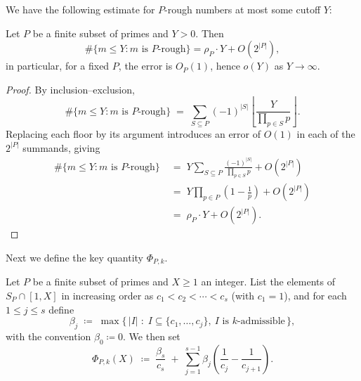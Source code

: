 \documentclass{amsart}
\begin{document}
We have the following estimate for $P$-rough numbers at most some cutoff $Y$:
\begin{lemma}\label{lem:P-rough-estimate}
   Let $P$ be a finite subset of primes and $Y > 0$. Then
   \begin{equation}
       \# \{m \leq Y : m \text{ is $P$-rough}\} = \rho_P \cdot Y + O (2^{|P|}),
   \end{equation}
   in particular, for a fixed $P$, the error is $O_P(1)$, hence $o(Y)$ as $Y \to \infty$.
\end{lemma}
\begin{proof}
By inclusion--exclusion,
\begin{equation}
\# \{m \leq Y : m \text{ is $P$-rough}\}  \;=\; \sum_{S \subseteq P} (-1)^{|S|} \left\lfloor \frac{Y}{\prod_{p \in S} p} \right\rfloor.
\end{equation}
Replacing each floor by its argument introduces an error of $O(1)$ in each of the $2^{|P|}$ summands, giving
\begin{equation}
\begin{aligned}
\# \{m \leq Y : m \text{ is $P$-rough}\} &\;=\; Y \sum_{S \subseteq P} \frac{(-1)^{|S|}}{\prod_{p \in S} p} + O(2^{|P|}) \\
&\;=\; Y \prod_{p \in P} \left(1 - \tfrac{1}{p}\right) + O(2^{|P|}) \\
&\;=\; \rho_P \cdot Y + O(2^{|P|}).
\end{aligned}
\end{equation}
\end{proof}

Next we define the key quantity $\Phi_{P,k}$.
\begin{definition}\label{def:phi-X-K}
   Let $P$ be a finite subset of primes and $X \geq 1$ an integer. List the elements of
$S_P \cap [1, X]$ in increasing order as $c_1 < c_2 < \cdots < c_s$ (with $c_1 = 1$), and
for each $1 \leq j \leq s$ define
\[
\beta_j \;\coloneqq\; \max\bigl\{\, |I| \;:\; I \subseteq \{c_1, \ldots, c_j\},\
I \text{ is } k\text{-admissible}\,\bigr\},
\]
with the convention $\beta_0 \coloneqq 0$.
We then set
\begin{equation}\label{eq:phi-def}
\Phi_{P,k}(X) \;\coloneqq\; \frac{\beta_s}{c_s} \;+\; \sum_{j=1}^{s-1} \beta_j \left( \frac{1}{c_j} - \frac{1}{c_{j+1}} \right).
\end{equation}
\end{definition}
\end{document}
